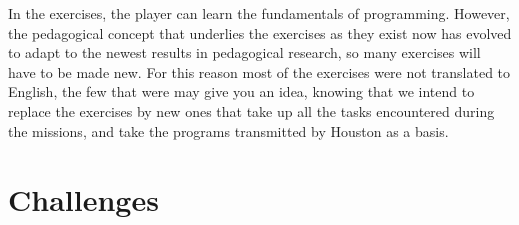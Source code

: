 In the exercises, the player can learn the fundamentals of programming. However, the pedagogical concept that underlies the exercises as they exist now has evolved to adapt to the newest results in pedagogical research, so many exercises will have to be made new. For this reason most of the exercises were not translated to English, the few that were may give you an idea, knowing that we intend to replace the exercises by new ones that take up all the tasks encountered during the missions, and take the programs transmitted by Houston as a basis.


\chapter{Challenges}


